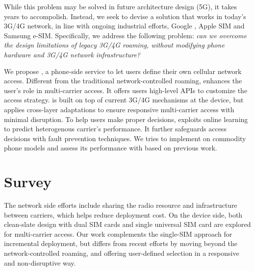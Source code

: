 \documentclass{./template/sig-alternate-10pt-tight}
\begin{document}
\begin{sloppypar}
While this problem may be solved in future architecture design (\eg 5G), it takes years to accompolish.
Instead, we seek to devise a solution that works in today's 3G/4G network, in line with ongoing industrial efforts, \eg Google \pfi, Apple SIM and Samsung e-SIM.
Specifically, we address the following problem: \emph{can we overcome the design limitations of legacy 3G/4G roaming, 
without modifying phone hardware and 3G/4G network infrastructure?}

We propose \icellular, a phone-side service to let users define their own cellular network access. 
Different from the traditional network-controlled roaming, \icellular enhances the user's role in multi-carrier access. %
It offers users high-level APIs to customize the access strategy. 
\icellular is built on top of current 3G/4G mechanisms at the device, but applies cross-layer adaptations to ensure 
responsive multi-carrier access with minimal disruption. 
To help users make proper decisions, \icellular exploits online learning to predict heterogenous carrier's performance. 
It further safeguards access decisions with fault prevention techniques. 
We tries to implement \icellular on commodity phone models and assess its performance with \pfi based on previous work.


\section{Survey}
The network side efforts include sharing the radio resource\cite{panchal2013mobile,DiFrancesco2014sharing} and infrastructure \cite{costa2013radio,kokku2012nvs,zaki2011lte,copeland2011resolving} between carriers, which helps reduce deployment cost.
On the device side, both clean-slate design with dual SIM cards\cite{deb2011mota,dual-sim-phone} and single universal SIM card\cite{fi,apple-sim,samsung-esim} are explored for multi-carrier access.
Our work complements the single-SIM approach for incremental deployment, but differs from recent efforts by moving beyond the network-controlled roaming, and offering user-defined selection in a responsive and non-disruptive way.


\end{sloppypar}
\end{document}
